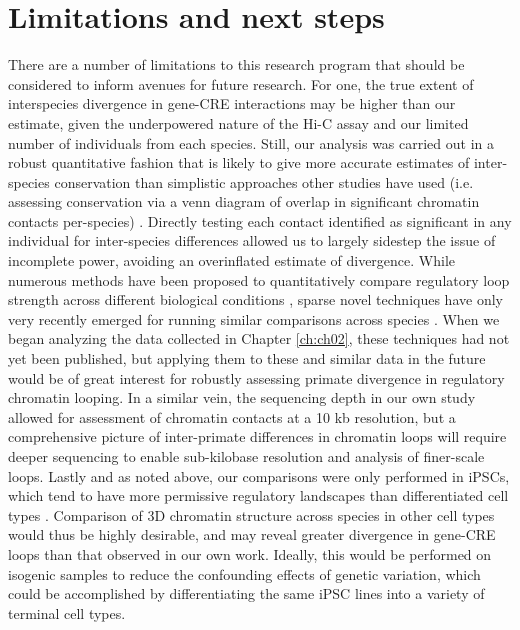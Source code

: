 \section{Limitations and next steps}
There are a number of limitations to this research program that should be considered to inform avenues for future research. For one, the true extent of interspecies divergence in gene-CRE interactions may be higher than our estimate, given the underpowered nature of the Hi-C assay \cite{Belton.2012} and our limited number of individuals from each species. Still, our analysis was carried out in a robust quantitative fashion that is likely to give more accurate estimates of inter-species conservation than simplistic approaches other studies have used (i.e. assessing conservation via a venn diagram of overlap in significant chromatin contacts per-species) \cite{Dixon.2012, Rao.2014}. Directly testing each contact identified as significant in any individual for inter-species differences allowed us to largely sidestep the issue of incomplete power, avoiding an overinflated estimate of divergence. While numerous methods have been proposed to quantitatively compare regulatory loop strength across different biological conditions \cite{Lun.2015, Paulsen.2014, Djekidel.2018, Fernandez.2020, Rao.2014}, sparse novel techniques have only very recently emerged for running similar comparisons across species \cite{Yang.2019, Nuriddinov.2019}. When we began analyzing the data collected in Chapter \ref{ch:ch02}, these techniques had not yet been published, but applying them to these and similar data in the future would be of great interest for robustly assessing primate divergence in regulatory chromatin looping. In a similar vein, the sequencing depth in our own study allowed for assessment of chromatin contacts at a 10 kb resolution, but a comprehensive picture of inter-primate differences in chromatin loops will require deeper sequencing to enable sub-kilobase resolution and analysis of finer-scale loops. Lastly and as noted above, our comparisons were only performed in iPSCs, which tend to have more permissive regulatory landscapes than differentiated cell types \cite{Spivakov.2007}. Comparison of 3D chromatin structure across species in other cell types would thus be highly desirable, and may reveal greater divergence in gene-CRE loops than that observed in our own work. Ideally, this would be performed on isogenic samples to reduce the confounding effects of genetic variation, which could be accomplished by differentiating the same iPSC lines into a variety of terminal cell types.

